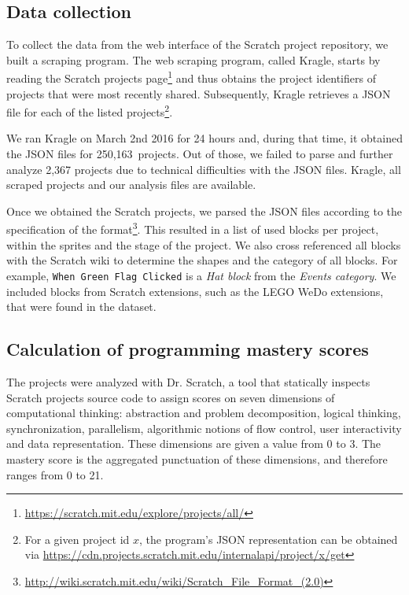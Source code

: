 \documentclass[10pt, conference]{IEEEtran}
\newcommand{\nPrograms}{250,163}
\newcommand{\fenia}[1]{\emph{\color{blue}Fenia says: #1}}
\begin{document}
\subsection{Data collection}
To collect the data from the web interface of the Scratch project repository, we built a scraping program.
The web scraping program, called Kragle, starts by reading the Scratch projects page\footnote{\label{scratchpublic}\url{https://scratch.mit.edu/explore/projects/all/}} and thus obtains the project identifiers of projects that were most recently shared.
Subsequently, Kragle retrieves a JSON file for each of the listed projects\footnote{For a given project id $x$, the program's JSON representation can be obtained via \url{https://cdn.projects.scratch.mit.edu/internalapi/project/x/get}}.

We ran Kragle on March 2nd 2016 for 24 hours and, during that time, it obtained the JSON files for \nPrograms~projects. Out of those, we failed to parse and further analyze 2,367 projects due to technical difficulties with the JSON files.
Kragle, all scraped projects and our analysis files are available\footnotemark[\ref{dataseturl}].

Once we obtained the Scratch projects, we parsed the JSON files according to the specification of the format\footnote{\url{http://wiki.scratch.mit.edu/wiki/Scratch_File_Format_(2.0)}}.
This resulted in a list of used blocks per project, within the sprites and the stage of the project.
We also cross referenced all blocks with the Scratch wiki to determine the shapes and the category of all blocks.
For example, \texttt{When Green Flag Clicked} is a \emph{Hat block} from the \emph{Events category}.
We included blocks from Scratch extensions, such as the LEGO WeDo extensions, that were found in the dataset.

\subsection{Calculation of programming mastery scores}
The projects were analyzed with Dr. Scratch, a tool that statically inspects Scratch projects source code to assign scores on seven dimensions of computational thinking: abstraction and problem decomposition, logical thinking, synchronization, parallelism, algorithmic notions of flow control, user interactivity and data representation. These dimensions are given a value from 0 to 3. The mastery score is the aggregated punctuation of these dimensions, and therefore ranges from 0 to 21.
\end{document}
